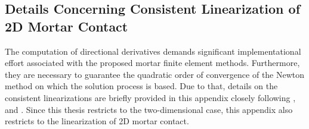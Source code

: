 \begin{appendices}

\chapter{Details Concerning Consistent Linearization of 2D Mortar Contact} %
\label{cha:details_concerning_consistent_linearization_of_2d_mortar_contact}
The computation of directional derivatives demands significant implementational effort associated with the proposed mortar finite element methods. Furthermore, they are necessary to guarantee the quadratic order of convergence of the Newton method on which the solution process is based. Due to that, details on the consistent linearizations are briefly provided in this appendix closely following \citet{popp2009}, \citet{popp2012} and \citet{farah2012}. Since this thesis restricts to the two-dimensional case, this appendix also restricts to the linearization of 2D mortar contact.

\end{appendices}